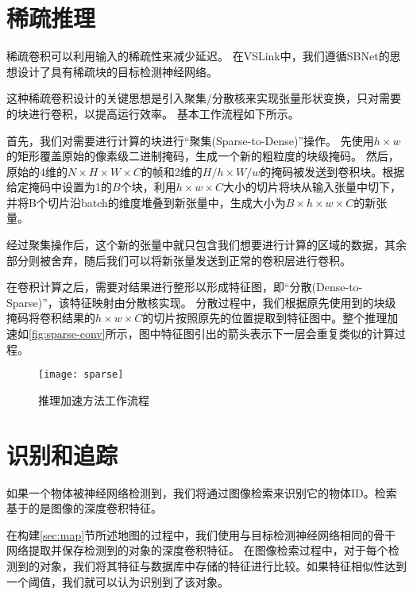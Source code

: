  
\section{稀疏推理}
稀疏卷积\cite{graham2015sparse,ren2018sbnet}可以利用输入的稀疏性来减少延迟。
在VSLink中，我们遵循SBNet\cite{ren2018sbnet}的思想设计了具有稀疏块的目标检测神经网络。

这种稀疏卷积设计\cite{ren2018sbnet}的关键思想是引入聚集/分散核来实现张量形状变换，只对需要的块进行卷积，以提高运行效率。
基本工作流程如下所示。

首先，我们对需要进行计算的块进行“聚集(Sparse-to-Dense)”操作。
先使用$h\times w$的矩形覆盖原始的像素级二进制掩码，生成一个新的粗粒度的块级掩码。
然后，原始的4维的$N \times H \times W \times C$的帧和2维的$H/h \times W/w$的掩码被发送到卷积块。根据给定掩码中设置为1的$B$个块，利用$h\times w \times C$大小的切片将块从输入张量中切下，并将B个切片沿batch的维度堆叠到新张量中，生成大小为$B\times h \times w \times C$的新张量。

经过聚集操作后，这个新的张量中就只包含我们想要进行计算的区域的数据，其余部分则被舍弃，随后我们可以将新张量发送到正常的卷积层进行卷积。

在卷积计算之后，需要对结果进行整形以形成特征图，即“分散(Dense-to-Sparse)”，该特征映射由分散核实现。
分散过程中，我们根据原先使用到的块级掩码将卷积结果的$h\times w \times C$的切片按照原先的位置提取到特征图中。整个推理加速如\autoref{fig:sparse-conv}所示，图中特征图引出的箭头表示下一层会重复类似的计算过程。

\begin{figure}[htbp]
	\centering
	\texttt{[image: sparse]}
	\caption{推理加速方法工作流程}
	\label{fig:sparse-conv}
\end{figure}

\section{识别和追踪}
如果一个物体被神经网络检测到，我们将通过图像检索来识别它的物体ID。检索基于的是图像的深度卷积特征。

在构建\ref{sec:map}节所述地图的过程中，我们使用与目标检测神经网络相同的骨干网络提取并保存检测到的对象的深度卷积特征。
在图像检索过程中，对于每个检测到的对象，我们将其特征与数据库中存储的特征进行比较。如果特征相似性达到一个阈值，我们就可以认为识别到了该对象。

